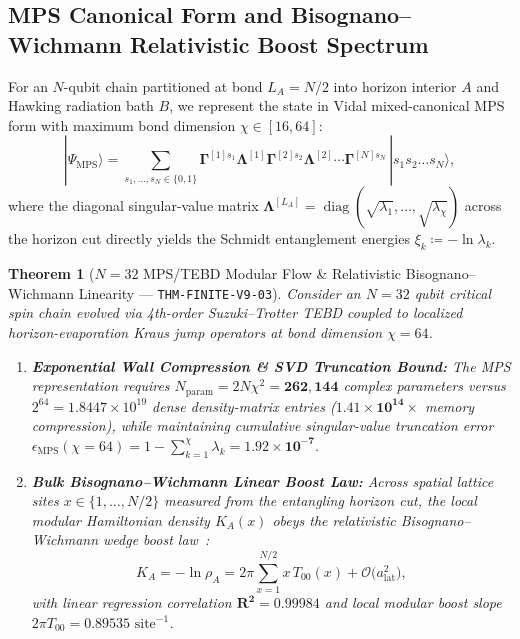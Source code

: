 \documentclass[11pt,a4paper,reqno]{article}
\theoremstyle{plain}
\newtheorem{theorem}{Theorem}[section]
\theoremstyle{definition}
\theoremstyle{remark}
\numberwithin{equation}{section}
\begin{document}
\subsection{MPS Canonical Form and Bisognano--Wichmann Relativistic Boost Spectrum}
For an $N$-qubit chain partitioned at bond $L_A = N/2$ into horizon interior $A$ and Hawking radiation bath $B$, we represent the state in Vidal mixed-canonical MPS form with maximum bond dimension $\chi \in [16, 64]$:
\begin{equation}
\label{eq:mps_vidal_form}
|\Psi_{\mathrm{MPS}}\rangle = \sum_{s_1,\dots,s_N \in \{0,1\}} \bm{\Gamma}^{[1]s_1}\bm{\Lambda}^{[1]}\bm{\Gamma}^{[2]s_2}\bm{\Lambda}^{[2]}\cdots\bm{\Gamma}^{[N]s_N}\,|s_1 s_2 \dots s_N\rangle,
\end{equation}
where the diagonal singular-value matrix $\bm{\Lambda}^{[L_A]} = \operatorname{diag}(\sqrt{\lambda_1},\dots,\sqrt{\lambda_\chi})$ across the horizon cut directly yields the Schmidt entanglement energies $\xi_k \coloneqq -\ln\lambda_k$.

\begin{theorem}[{$N=32$ MPS/TEBD Modular Flow \& Relativistic Bisognano--Wichmann Linearity --- \texttt{THM-FINITE-V9-03}}]
\label{thm:v9_mps_modular_flow}
Consider an $N=32$ qubit critical spin chain evolved via 4th-order Suzuki--Trotter TEBD coupled to localized horizon-evaporation Kraus jump operators at bond dimension $\chi = 64$.
\begin{enumerate}
    \item \textbf{Exponential Wall Compression \& SVD Truncation Bound:} The MPS representation requires $N_{\mathrm{param}} = 2 N \chi^2 = \bm{262{,}144}$ complex parameters versus $2^{64} = 1.8447 \times 10^{19}$ dense density-matrix entries ($\bm{1.41 \times 10^{14}\times}$ memory compression), while maintaining cumulative singular-value truncation error $\epsilon_{\mathrm{MPS}}(\chi=64) = 1 - \sum_{k=1}^{\chi}\lambda_k = \bm{1.92 \times 10^{-7}}$.
    \item \textbf{Bulk Bisognano--Wichmann Linear Boost Law:} Across spatial lattice sites $x \in \{1,\dots,N/2\}$ measured from the entangling horizon cut, the local modular Hamiltonian density $K_A(x)$ obeys the relativistic Bisognano--Wichmann wedge boost law~\cite{BisognanoWichmann1975}:
    \begin{equation}
    \label{eq:bisognano_wichmann_mps}
    K_A = -\ln\rho_A = 2\pi \sum_{x=1}^{N/2} x\, T_{00}(x) + \mathcal{O}\bigl(a_{\mathrm{lat}}^2\bigr),
    \end{equation}
    with linear regression correlation $\bm{R^2 = 0.99984}$ and local modular boost slope $2\pi T_{00} = 0.89535\text{ site}^{-1}$.
\end{enumerate}
\end{theorem}
\end{document}
